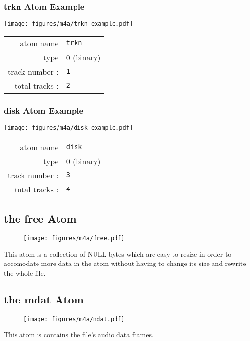\subsubsection{trkn Atom Example}
\texttt{[image: figures/m4a/trkn-example.pdf]}
\par
\noindent
\begin{tabular}{rl}
  \textsf{atom name} & \texttt{trkn} \\
  \textsf{type} & 0 (binary) \\
  \textsf{track number} : & \texttt{1} \\
  \textsf{total tracks} : & \texttt{2} \\
\end{tabular}

\subsubsection{disk Atom Example}
\texttt{[image: figures/m4a/disk-example.pdf]}
\par
\noindent
\begin{tabular}{rl}
  \textsf{atom name} & \texttt{disk} \\
  \textsf{type} & 0 (binary) \\
  \textsf{track number} : & \texttt{3} \\
  \textsf{total tracks} : & \texttt{4} \\
\end{tabular}

\clearpage

\subsection{the free Atom}
\begin{figure}[h]
  \texttt{[image: figures/m4a/free.pdf]}
\end{figure}
\par
\noindent
This atom is a collection of NULL bytes which are easy
to resize in order to accomodate more data
in the  atom without having to change
its size and rewrite the whole file.

\subsection{the mdat Atom}
\begin{figure}[h]
  \texttt{[image: figures/m4a/mdat.pdf]}
\end{figure}
\par
\noindent
This atom is contains the file's audio data frames.
